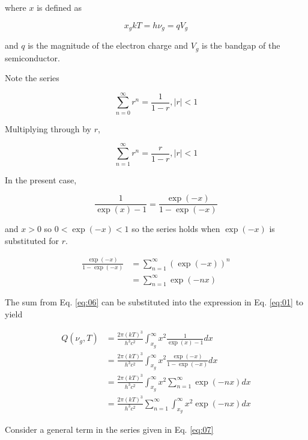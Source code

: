 \documentclass[letterpaper,12pt]{article}
\begin{document}
\noindent where $x$ is defined as

\begin{equation} \label{eq:02}
x_{g}kT = h \nu_{g} = q V_{g}
\end{equation}

\noindent and $q$ is the magnitude of the electron charge and $V_{g}$ is the bandgap of the semiconductor.

Note the series

\begin{equation} \label{eq:03}
\sum_{n = 0}^{\infty} r^{n} = \frac{1}{1-r}, |r| < 1
\end{equation}

\noindent Multiplying through by $r$,

\begin{equation} \label{eq:04}
\sum_{n = 1}^{\infty} r^{n} = \frac{r}{1-r}, |r| < 1
\end{equation}

In the present case,

\begin{equation} \label{eq:05}
\frac{1}{\exp(x) - 1} = \frac{\exp(-x)}{1 - \exp(-x)}
\end{equation}

\noindent and $x > 0$ so $0 < \exp(-x) < 1$ so the series holds when $\exp(-x)$ is substituted for $r$.

\begin{align} \label{eq:06}
\frac{\exp(-x)}{1 - \exp(-x)} &= \sum_{n = 1}^{\infty} \left( \exp(-x) \right)^{n} \\
 &= \sum_{n = 1}^{\infty} \exp(-nx)
\end{align}

The sum from Eq. \ref{eq:06} can be substituted into the expression in Eq. \ref{eq:01} to yield

\begin{align} \label{eq:07}
Q(\nu_{g}, T) &= \frac{2\pi (kT)^{3}}{h^{3} c^{2}} \int_{x_{g}}^{\infty} x^{2} \frac{1}{\exp(x) - 1} dx \\
 &= \frac{2\pi (kT)^{3}}{h^{3} c^{2}} \int_{x_{g}}^{\infty} x^{2} \frac{\exp(-x)}{1 - \exp(-x)} dx \\
 &= \frac{2\pi (kT)^{3}}{h^{3} c^{2}} \int_{x_{g}}^{\infty} x^{2} \sum_{n = 1}^{\infty} \exp(-nx) dx \\
 &= \frac{2\pi (kT)^{3}}{h^{3} c^{2}} \sum_{n = 1}^{\infty} \int_{x_{g}}^{\infty} x^{2} \exp(-nx) dx
\end{align}

Consider a general term in the series given in Eq. \ref{eq:07}
\end{document}
